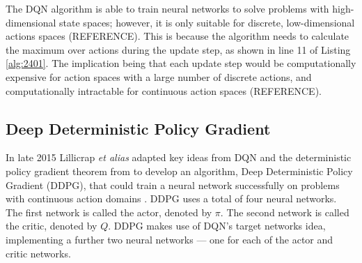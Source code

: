 The DQN algorithm is able to train neural networks to solve problems with high-dimensional state spaces; however, it is only suitable for discrete, low-dimensional actions spaces (REFERENCE). This is because the algorithm needs to calculate the maximum over actions during the update step, as shown in line 11 of Listing \ref{alg:2401}. The implication being that each update step would be computationally expensive for action spaces with a large number of discrete actions, and computationally intractable for continuous action spaces (REFERENCE).

\subsection{Deep Deterministic Policy Gradient}\label{ssec:deep_deterministic_policy_gradient}
In late 2015 Lillicrap \textit{et alias} adapted key ideas from DQN and the deterministic policy gradient theorem from \cite{Silver2014} to develop an algorithm, Deep Deterministic Policy Gradient (DDPG), that could train a neural network successfully on problems with continuous action domains \cite{Lillicrap2015}. DDPG uses a total of four neural networks. The first network is called the actor, denoted by $\pi$. The second network is called the critic, denoted by $Q$. DDPG makes use of DQN's target networks idea, implementing a further two neural networks --- one for each of the actor and critic networks.

